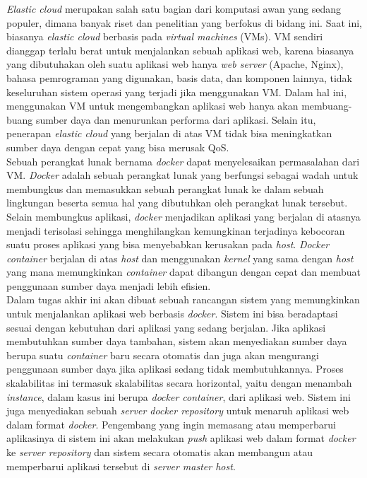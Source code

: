 		\indent \textit{Elastic cloud} merupakan salah satu bagian dari komputasi awan yang sedang populer, dimana banyak riset dan penelitian yang berfokus di bidang ini. Saat ini, biasanya \textit{elastic cloud} berbasis pada \textit{virtual machines} (VMs). VM sendiri dianggap terlalu berat untuk menjalankan sebuah aplikasi web, karena biasanya yang dibutuhakan oleh suatu aplikasi web hanya \textit{web server} (Apache, Nginx), bahasa pemrograman yang digunakan, basis data, dan komponen lainnya, tidak keseluruhan sistem operasi yang terjadi jika menggunakan VM. Dalam hal ini, menggunakan VM untuk mengembangkan aplikasi web hanya akan membuang-buang sumber daya dan menurunkan performa dari aplikasi. Selain itu, penerapan \textit{elastic cloud} yang berjalan di atas VM tidak bisa meningkatkan sumber daya dengan cepat yang bisa merusak QoS.\\
		\indent Sebuah perangkat lunak bernama \textit{docker} dapat menyelesaikan permasalahan dari VM. \textit{Docker} adalah sebuah perangkat lunak yang berfungsi sebagai wadah untuk membungkus dan memasukkan sebuah perangkat lunak ke dalam sebuah lingkungan beserta semua hal yang dibutuhkan oleh perangkat lunak tersebut. Selain membungkus aplikasi, \textit{docker} menjadikan aplikasi yang berjalan di atasnya menjadi terisolasi sehingga menghilangkan kemungkinan terjadinya kebocoran suatu proses aplikasi yang bisa menyebabkan kerusakan pada \textit{host}. \textit{Docker container} berjalan di atas \textit{host} dan menggunakan \textit{kernel} yang sama dengan \textit{host} yang mana memungkinkan \textit{container} dapat dibangun dengan cepat dan membuat penggunaan sumber daya menjadi lebih efisien.\\
		\indent Dalam tugas akhir ini akan dibuat sebuah rancangan sistem yang memungkinkan untuk menjalankan aplikasi web berbasis \textit{docker}. Sistem ini bisa beradaptasi sesuai dengan kebutuhan dari aplikasi yang sedang berjalan. Jika aplikasi membutuhkan sumber daya tambahan, sistem akan menyediakan sumber daya berupa suatu \textit{container} baru secara otomatis dan juga akan mengurangi penggunaan sumber daya jika aplikasi sedang tidak membutuhkannya. Proses skalabilitas ini termasuk skalabilitas secara horizontal, yaitu dengan menambah \textit{instance}, dalam kasus ini berupa \textit{docker container}, dari aplikasi web. Sistem ini juga menyediakan sebuah \textit{server docker repository} untuk menaruh aplikasi web dalam format \textit{docker}. Pengembang yang ingin memasang atau memperbarui aplikasinya di sistem ini akan melakukan \textit{push} aplikasi web dalam format \textit{docker} ke \textit{server repository} dan sistem secara otomatis akan membangun atau memperbarui aplikasi tersebut di \textit{server master host}.

